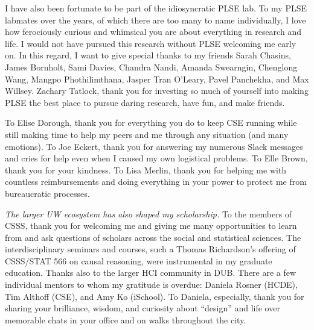 I have also been fortunate to be part of the idiosyncratic PLSE
lab. 
To my PLSE labmates over the years, of which there are too many to name
individually, I love how ferociously curious and whimsical you are about
everything in research and life. I would not have pursued this
research without PLSE welcoming me early on. In this regard, I want to give
special thanks to my friends Sarah Chasins, James Bornholt, Sami Davies, Chandra
Nandi, Amanda Swearngin, Chenglong Wang, Mangpo Phothilimthana, Jasper Tran O'Leary, Pavel Panchekha,
and Max Willsey. Zachary Tatlock, thank you for investing so much of yourself
into making PLSE the best place to pursue daring research, have fun, and make
friends. 

To Elise Dorough, thank you for everything you do to keep CSE running while
still making time to help my peers and me through any situation (and many
emotions). To Joe Eckert, thank you for answering my numerous Slack messages
and cries for help even when I caused my own logistical problems. To
Elle Brown, thank you for your kindness. To Lisa Merlin, thank you for
helping me with countless reimbursements and doing everything in your power
to protect me from bureaucratic processes.

\textit{The larger UW ecosystem has also shaped my scholarship.} To the members
of CSSS, thank you for welcoming me and giving me many opportunities to learn
from and ask questions of scholars across the social and statistical sciences.
The interdisciplinary seminars and courses, such a Thomas Richardson's offering
of CSSS/STAT 566 on causal reasoning, were instrumental in my graduate
education. Thanks also to the larger HCI community in DUB. There are a few
individual mentors to whom my gratitude is overdue: Daniela Rosner (HCDE), Tim
Althoff (CSE), and Amy Ko (iSchool). To Daniela, especially, thank you for
sharing your brilliance, wisdom, and curiosity about ``design'' and life over
memorable chats in your office and on walks throughout the city. 

